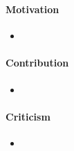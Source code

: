 \documentclass[12pt]{article}	%
\begin{document}
\subsubsection*{}
\paragraph{Motivation}
\begin{itemize}
	\item
\end{itemize}
\paragraph{Contribution}
\begin{itemize}
	\item
\end{itemize}
\paragraph{Criticism}
\begin{itemize}
	\item
\end{itemize}


\cite{Kohlbecker1986Hygienic,Kohlbecker1987Macrobyexample,Bawden1988Syntactic,Clinger1991Macros,Dybvig1992Syntactic,Dybvig1992Writing,Flatt2002Composable,Culpepper2004Taming,Herman2008Theory,Culpepper2010Fortifying}


\end{document}

